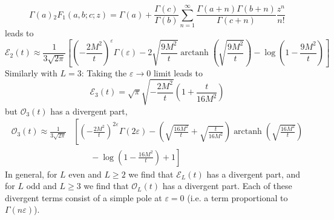 \begin{equation}
	\Gamma(a) {}_{2}F_{1}(a, b; c; z) = \Gamma(a) + \frac{\Gamma(c)}{\Gamma(b)} \sum_{n = 1}^{\infty} \frac{\Gamma(a + n) \Gamma(b + n)}{\Gamma(c + n)} \frac{z^{n}}{n!}
\end{equation}
leads to
\begin{equation}
	\mathcal{E}_{2}(t) \approx \frac{1}{3 \sqrt{2 \pi}} \left[ \left(- \frac{2M^{2}}{t} \right)^{\varepsilon}\Gamma(\varepsilon) - 2 \sqrt{\frac{9M^{2}}{t}} \operatorname{arctanh}{\left( \sqrt{\frac{9M^{2}}{t}} \right)} - \log{\left(1 - \frac{9 M^{2}}{t} \right)} \right]
\end{equation}
Similarly with $L = 3$: Taking the $\varepsilon \rightarrow 0$ limit leads to
\begin{equation}
	\mathcal{E}_{3}(t) = \sqrt{\pi} \sqrt{- \frac{2M^{2}}{t}} \left( 1 + \frac{t}{16M^{2}} \right)
\end{equation}
but $\mathcal{O}_{3}(t)$ has a divergent part,
\begin{equation}
\begin{split}
	\mathcal{O}_{3}(t) \approx \frac{1}{3\sqrt{2 \pi}} &{} \left[ \left(- \frac{2M^{2}}{t} \right)^{2\varepsilon}\Gamma(2\varepsilon) - \left( \sqrt{\frac{16 M^{2}}{t}} + \sqrt{\frac{t}{16 M^{2}}} \right) \operatorname{arctanh}{\left( \sqrt{\frac{16M^{2}}{t}} \right)} \right. \\
	& \qquad - \left. \log{\left(1 - \frac{16 M^{2}}{t} \right)} + 1 \right]
\end{split}
\end{equation}
In general, for $L$ even and $L \geq 2$ we find that $\mathcal{E}_{L}(t)$ has a divergent part, and for $L$ odd and $L \geq 3$ we find that $\mathcal{O}_{L}(t)$ has a divergent part. Each of these divergent terms consist of a simple pole at $\varepsilon = 0$ (i.e. a term proportional to $\Gamma(n \varepsilon)$).